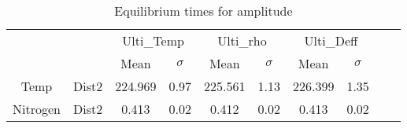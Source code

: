 \begin{table}[h]
\centering
\caption{Equilibrium times for amplitude}
\label{table:5}
\begin{tabular}{cccccccccc}
\toprule
 &  & \multicolumn{2}{c}{Ulti_Temp} & \multicolumn{2}{c}{Ulti_rho} & \multicolumn{2}{c}{Ulti_Deff} \\
 &  & Mean & $\sigma$ & Mean & $\sigma$ & Mean & $\sigma$ \\
\midrule
Temp & Dist2 & 224.969 & 0.97 & 225.561 & 1.13 & 226.399 & 1.35 \\
Nitrogen & Dist2 & 0.413 & 0.02 & 0.412 & 0.02 & 0.413 & 0.02 \\
\bottomrule
\end{tabular}
\end{table}
